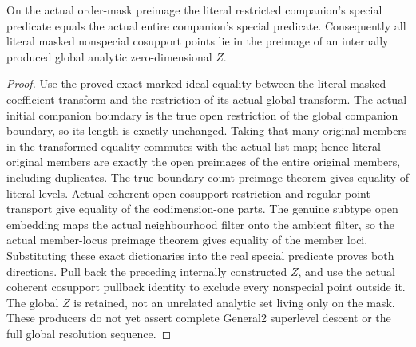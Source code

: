 \begin{theorem}
\label{hir:general-two-literal-mask-special-exception}
\leanok
On the actual order-mask preimage the literal restricted companion's
special predicate equals the actual entire companion's special predicate.
Consequently all literal masked nonspecial cosupport points lie in the
preimage of an internally produced global analytic zero-dimensional $Z$.
\end{theorem}
\begin{proof}
Use the proved exact marked-ideal equality between the literal masked
coefficient transform and the restriction of its actual global transform.
The actual initial companion boundary is the true open restriction of
the global companion boundary, so its length is exactly unchanged. Taking
that many original members in the transformed equality commutes with the
actual list map; hence literal original members are exactly the open
preimages of the entire original members, including duplicates. The true
boundary-count preimage theorem gives equality of literal levels. Actual
coherent open cosupport restriction and regular-point transport give
equality of the codimension-one parts. The genuine subtype open embedding
maps the actual neighbourhood filter onto the ambient filter, so the actual
member-locus preimage theorem gives equality of the member loci. Substituting
these exact dictionaries into the real special predicate proves both
directions. Pull back the preceding internally constructed $Z$, and use
the actual coherent cosupport pullback identity to exclude every nonspecial
point outside it. The global $Z$ is retained, not an unrelated analytic set
living only on the mask. These producers do not yet assert complete
General2 superlevel descent or the full global resolution sequence.
\end{proof}
